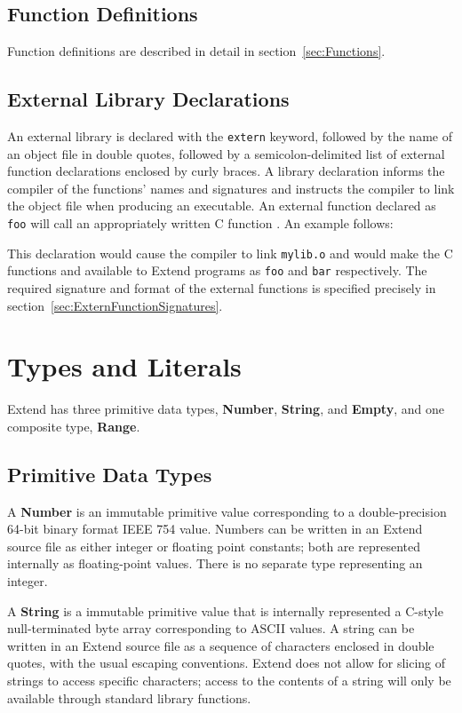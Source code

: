 	\subsection{Function Definitions}
		Function definitions are described in detail in section~\ref{sec:Functions}.
	\subsection{External Library Declarations}
	  An external library is declared with the \texttt{extern} keyword, followed by the name of an object file in double quotes, followed by a semicolon-delimited list of external function declarations enclosed by curly braces. A library declaration informs the compiler of the functions' names and signatures and instructs the compiler to link the
		object file when producing an executable. An external function declared as \texttt{foo} will call an appropriately written C function \texttt{}. An example follows:
		
		This declaration would cause the compiler to link \texttt{mylib.o} and would make the C functions \texttt{} and \texttt{} available to Extend programs as \texttt{foo} and \texttt{bar} respectively. The required signature and format of the external functions is specified precisely in section~\ref{sec:ExternFunctionSignatures}.
\section{Types and Literals}
		Extend has three primitive data types, \textbf{Number}, \textbf{String}, and \textbf{Empty}, and one composite type, \textbf{Range}.
	\subsection{Primitive Data Types}
		A \textbf{Number} is an immutable primitive value corresponding to a double-precision 64-bit binary format IEEE 754 value. Numbers can be written in an Extend source file as either integer or floating point constants; both are represented internally as floating-point values. There is no separate type representing an integer.

		A \textbf{String} is a immutable primitive value that is internally represented a C-style null-terminated byte array corresponding to ASCII values. A string can be written in an Extend source file as a sequence of characters enclosed in double quotes, with the usual escaping conventions. Extend does not allow for slicing of strings to access specific characters; access to the contents of a string will only be available through standard library functions.

